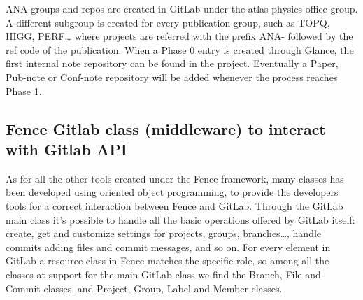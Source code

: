 ANA groups and repos are created in GitLab under the atlas-physics-office group. A different subgroup is created for every publication group, such as TOPQ, HIGG, PERF… where projects are referred with the prefix ANA- followed by the ref code of the publication. When a Phase 0 entry is created through Glance, the first internal note repository can be found in the project. Eventually a Paper, Pub-note or Conf-note repository will be added whenever the process reaches Phase 1. 

\subsection{Fence Gitlab class (middleware) to interact with Gitlab API}

As for all the other tools created under the Fence framework, many classes has been developed using oriented object programming, to provide the developers tools for a correct interaction between Fence and GitLab. Through the GitLab main class it’s possible to handle all the basic operations offered by GitLab itself: create, get and customize settings for projects, groups, branches…,  handle commits adding files and commit messages, and so on.
For every element in GitLab a resource class in Fence matches the specific role, so among all the classes at support for the main GitLab class we find the Branch, File and Commit classes, and Project, Group, Label and Member classes. 
